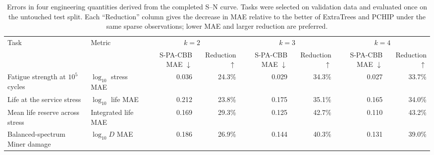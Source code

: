 \begin{table}[t]
\caption{Errors in four engineering quantities derived from the completed S--N curve. Tasks were selected on validation data and evaluated once on the untouched test split. Each ``Reduction'' column gives the decrease in MAE relative to the better of ExtraTrees and PCHIP under the same sparse observations; lower MAE and larger reduction are preferred.}
\label{tab:selected_downstream}
\centering\scriptsize\setlength{\tabcolsep}{4.5pt}
\begin{tabular}{llrrrrrr}
\toprule
Task & Metric & \multicolumn{2}{c}{$k=2$} & \multicolumn{2}{c}{$k=3$} & \multicolumn{2}{c}{$k=4$} \\
\cmidrule(lr){3-4}\cmidrule(lr){5-6}\cmidrule(lr){7-8}
 & & \makecell{S-PA-CBB\\MAE $\downarrow$} & \makecell{Reduction\\$\uparrow$} & \makecell{S-PA-CBB\\MAE $\downarrow$} & \makecell{Reduction\\$\uparrow$} & \makecell{S-PA-CBB\\MAE $\downarrow$} & \makecell{Reduction\\$\uparrow$} \\
\midrule
Fatigue strength at $10^5$ cycles & $\log_{10}$ stress MAE & 0.036 & 24.3\% & 0.029 & 34.3\% & 0.027 & 33.7\% \\
Life at the service stress & $\log_{10}$ life MAE & 0.212 & 23.8\% & 0.175 & 35.1\% & 0.165 & 34.0\% \\
Mean life reserve across stress & Integrated life MAE & 0.169 & 29.3\% & 0.125 & 42.7\% & 0.110 & 43.2\% \\
Balanced-spectrum Miner damage & $\log_{10}D$ MAE & 0.186 & 26.9\% & 0.144 & 40.3\% & 0.131 & 39.0\% \\
\bottomrule
\end{tabular}
\end{table}

